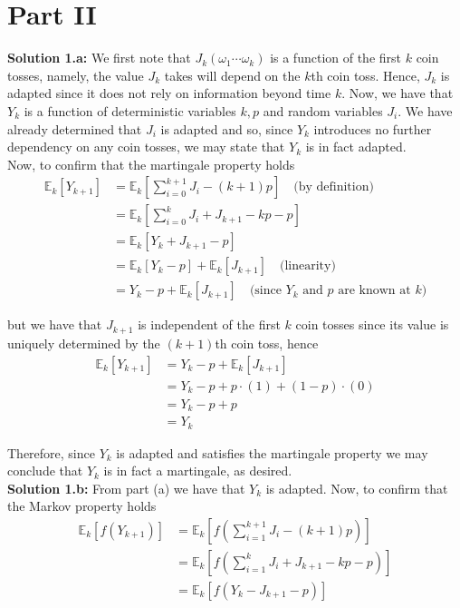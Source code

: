 \documentclass[12pt]{article}
\newlength\tindent
\renewcommand{\indent}{\hspace*{\tindent}}
\newcommand{\E}{\mathbb E}
\begin{document}
\section*{Part II}

{\bf Solution 1.a:} We first note that $J_k(\omega_1\cdots\omega_k)$ is a function of the first $k$ coin tosses, namely, the value $J_k$ takes will depend on the $k$th coin toss. Hence, $J_k$ is adapted since it does not rely on information beyond time $k$. Now, we have that $Y_k$ is a function of deterministic variables $k, p$ and random variables $J_i$. We have already determined that $J_i$ is adapted and so, since $Y_k$ introduces no further dependency on any coin tosses, we may state that $Y_k$ is in fact adapted. \\

Now, to confirm that the martingale property holds
\begin{align*}
	\E_k \left[ Y_{k + 1} \right] &= \E_k \left[ \sum^{k + 1} _{i = 0} J_i - (k + 1)p \right] \quad \text{(by definition)} \\
	&= \E_k \left[ \sum^k_{i = 0} J_i + J_{k + 1} - kp - p \right] \\
	&= \E_k \left[ Y_k + J_{k + 1} - p \right] \\
	&= \E_k \left[ Y_k - p \right] + \E_k \left[ J_{k + 1} \right] \quad \text{(linearity)} \\
	&= Y_k - p + \E_k \left[ J_{k + 1} \right] \quad \text{(since $Y_k$ and $p$ are known at $k$)}
\end{align*}

but we have that $J_{k + 1}$ is independent of the first $k$ coin tosses since its value is uniquely determined by the $(k + 1)$th coin toss, hence
\begin{align*}
	\E_k \left[ Y_{k + 1} \right] &= Y_k - p + \E_k \left[ J_{k + 1} \right] \\
	&= Y_k - p + p\cdot(1) + (1 - p)\cdot(0) \\
	&= Y_k - p + p \\
	&= Y_k
\end{align*}

\indent Therefore, since $Y_k$ is adapted and satisfies the martingale property we may conclude that $Y_k$ is in fact a martingale, as desired. \\


{\bf Solution 1.b:} From part (a) we have that $Y_k$ is adapted. Now, to confirm that the Markov property holds
\begin{align*}
	\E_k \left[ f(Y_{k + 1}) \right] &= \E_k \left[ f \left( \sum^{k + 1}_{i = 1} J_i - (k + 1)p \right) \right] \\ 
	&= \E_k \left[ f \left( \sum^k_{i = 1} J_i + J_{k + 1} - kp - p \right) \right] \\
	&= \E_k \left[ f \left( Y_k - J_{k + 1} - p \right) \right]
\end{align*}
\end{document}
